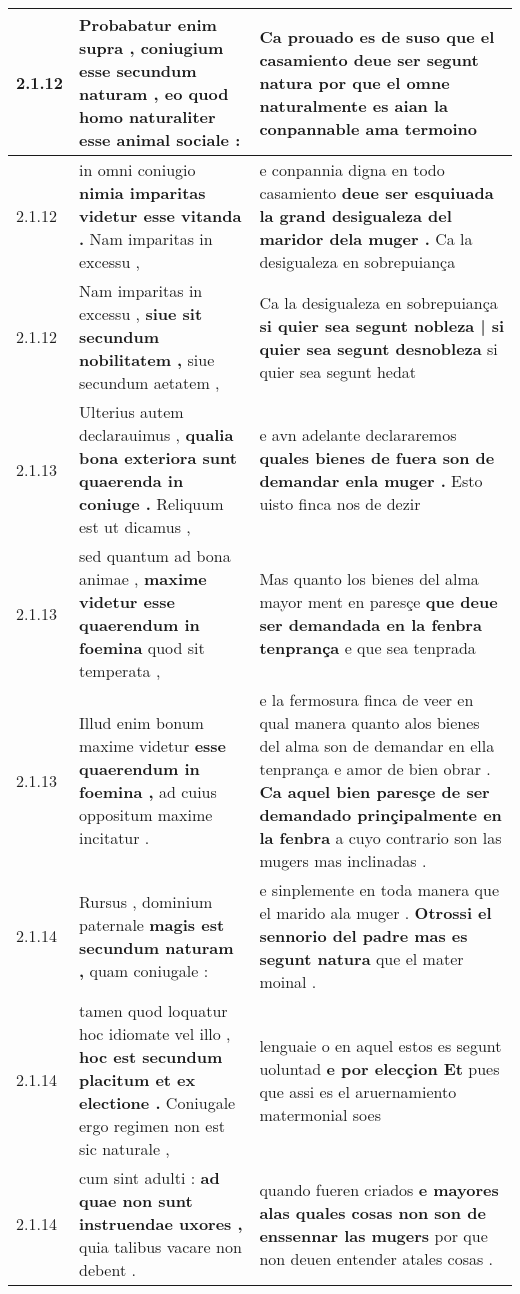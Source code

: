 \begin{tabular}{|p{1cm}|p{6.5cm}|p{6.5cm}|}
2.1.12 & Probabatur enim supra , \textbf{ coniugium esse secundum naturam , } eo quod homo naturaliter esse animal sociale : & Ca prouado es de suso \textbf{ que el casamiento deue ser segunt natura } por que el omne naturalmente es aian la conpannable ama termoino \\\hline
2.1.12 & in omni coniugio \textbf{ nimia imparitas videtur esse vitanda . } Nam imparitas in excessu , & e conpannia digna en todo casamiento \textbf{ deue ser esquiuada la grand desigualeza del maridor dela muger . } Ca la desigualeza en sobrepuiança \\\hline
2.1.12 & Nam imparitas in excessu , \textbf{ siue sit secundum nobilitatem , } siue secundum aetatem , & Ca la desigualeza en sobrepuiança \textbf{ si quier sea segunt nobleza | si quier sea segunt desnobleza } si quier sea segunt hedat \\\hline
2.1.13 & Ulterius autem declarauimus , \textbf{ qualia bona exteriora sunt quaerenda in coniuge . } Reliquum est ut dicamus , & e avn adelante declararemos \textbf{ quales bienes de fuera son de demandar enla muger . } Esto uisto finca nos de dezir \\\hline
2.1.13 & sed quantum ad bona animae , \textbf{ maxime videtur esse quaerendum in foemina } quod sit temperata , & Mas quanto los bienes del alma mayor ment en paresçe \textbf{ que deue ser demandada en la fenbra tenprança } e que sea tenprada \\\hline
2.1.13 & Illud enim bonum maxime videtur \textbf{ esse quaerendum in foemina , } ad cuius oppositum maxime incitatur . & e la fermosura finca de veer en qual manera quanto alos bienes del alma son de demandar en ella tenprança e amor de bien obrar . \textbf{ Ca aquel bien paresçe de ser demandado prinçipalmente en la fenbra } a cuyo contrario son las mugers mas inclinadas . \\\hline
2.1.14 & Rursus , dominium paternale \textbf{ magis est secundum naturam , } quam coniugale : & e sinplemente en toda manera que el marido ala muger . \textbf{ Otrossi el sennorio del padre mas es segunt natura } que el mater moinal . \\\hline
2.1.14 & tamen quod loquatur hoc idiomate vel illo , \textbf{ hoc est secundum placitum et ex electione . } Coniugale ergo regimen non est sic naturale , & lenguaie o en aquel estos es segunt uoluntad \textbf{ e por elecçion Et } pues que assi es el aruernamiento matermonial soes \\\hline
2.1.14 & cum sint adulti : \textbf{ ad quae non sunt instruendae uxores , } quia talibus vacare non debent . & quando fueren criados \textbf{ e mayores alas quales cosas non son de enssennar las mugers } por que non deuen entender atales cosas . \\\hline

\end{tabular}
